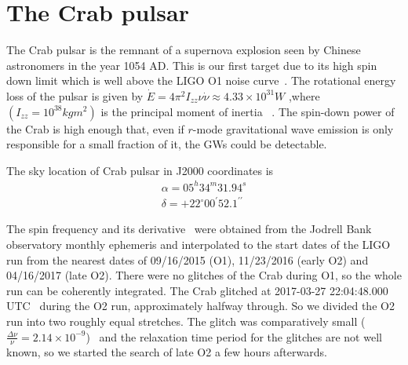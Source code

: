 \documentclass{ttuthes2007}
\begin{document}
	

\section{The Crab pulsar} \label{timing}
The Crab pulsar is the remnant of a supernova explosion seen by
Chinese astronomers in the year 1054 AD. This is our first target due to its
high spin down limit which is  well above the LIGO \ac{O1} noise
curve~\cite{PhysRevD.100.064013}. The rotational energy loss of the
pulsar is given by $\dot{E}=4\pi^2I_{zz}\nu\dot{\nu}\approx 4.33\times10^{31}W$
,where $(I_{zz}=10^{38}kg m^2)$ is the principal moment of inertia ~\cite{Abbott_2008}. The spin-down power of the Crab is high enough that, even if
$r$-mode gravitational wave emission is only responsible for a small fraction of
it, the \acp{GW} could be detectable.
 
The sky location of Crab pulsar in J2000 coordinates is~\cite{1993MNRAS.265.1003L} 
\begin{equation}
\begin{aligned} 
\alpha =05^h34^m31.94^s\\ 
\delta=
+22^\circ00^\prime52.1^{\prime\prime} 
\end{aligned} 
\end{equation}
 
The spin frequency and its derivative~\cite{1993MNRAS.265.1003L} were obtained
from the Jodrell Bank observatory monthly ephemeris and interpolated to the
start dates of the LIGO run from the nearest dates of 09/16/2015 (\ac{O1}),
11/23/2016 (early O2) and 04/16/2017 (late O2). There were no glitches of the
Crab during \ac{O1}, so the whole run can be coherently integrated. The Crab
glitched at 2017-03-27 22:04:48.000 UTC~\cite{Espinoza_2011} during the \ac{O2}
run, approximately halfway through. So we divided the \ac{O2} run into two
roughly equal stretches.  The glitch was comparatively small
($\frac{\Delta\nu}{\nu}= 2.14\times 10^{-9}$)~\cite{Espinoza_2011} and the
relaxation time period for the glitches are not well known, so we started the
search of late \ac{O2} a few hours afterwards.
\end{document}
